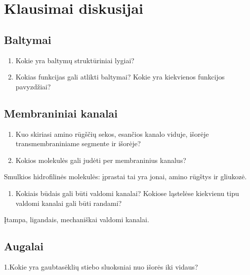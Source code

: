 \documentclass[]{book}
\providecommand{\tightlist}{%
  \setlength{\itemsep}{0pt}\setlength{\parskip}{0pt}}
\begin{document}
\hypertarget{klausimai-diskusijai}{%
\chapter{Klausimai diskusijai}\label{klausimai-diskusijai}}

\hypertarget{baltymai}{%
\section{Baltymai}\label{baltymai}}

\begin{enumerate}
\def\labelenumi{\arabic{enumi}.}
\tightlist
\item
  Kokie yra baltymų struktūriniai lygiai?
\item
  Kokias funkcijas gali atlikti baltymai? Kokie yra kiekvienos funkcijos pavyzdžiai?
\end{enumerate}

\hypertarget{membraniniai-kanalai}{%
\section{Membraniniai kanalai}\label{membraniniai-kanalai}}

\begin{enumerate}
\def\labelenumi{\arabic{enumi}.}
\tightlist
\item
  Kuo skiriasi amino rūgščių sekos, esančios kanalo viduje, išorėje transmembraniniame segmente ir išorėje?
\item
  Kokios molekulės gali judėti per membraninius kanalus?
\end{enumerate}

Smulkios hidrofilinės molekulės: įprastai tai yra jonai, amino rūgštys ir gliukozė.

\begin{enumerate}
\def\labelenumi{\arabic{enumi}.}
\setcounter{enumi}{2}
\tightlist
\item
  Kokiais būdais gali būti valdomi kanalai? Kokiose ląstelėse kiekvienu tipu valdomi kanalai gali būti randami?
\end{enumerate}

Įtampa, ligandais, mechaniškai valdomi kanalai.

\hypertarget{augalai}{%
\section{Augalai}\label{augalai}}

1.Kokie yra gaubtasėklių stiebo sluoksniai nuo išorės iki vidaus?
\end{document}
